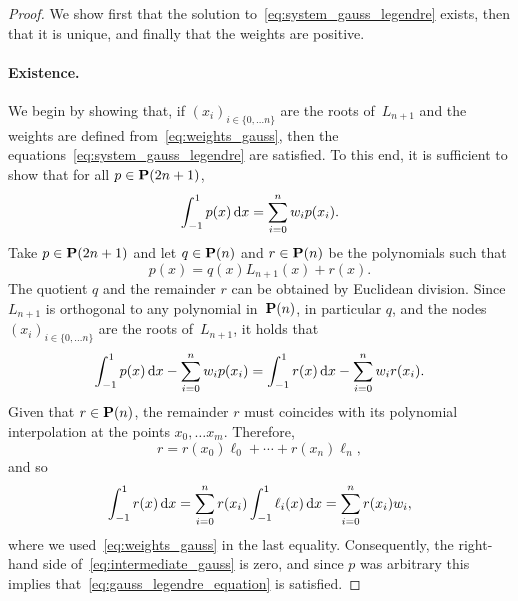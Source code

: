 \begin{proof}
    We show first that the solution to~\eqref{eq:system_gauss_legendre} exists,
    then that it is unique,
    and finally that the weights are positive.
    \paragraph{Existence.}
    We begin by showing that,
    if $(x_i)_{i \in \{0,\dotsc n\}}$ are the roots of~$L_{n+1}$ and the weights are defined from~\eqref{eq:weights_gauss},
    then the equations~\eqref{eq:system_gauss_legendre} are satisfied.
    To this end,
    it is sufficient to show that for all $p \in \mathbf P(2n + 1)$,
    \begin{equation}
        \label{eq:gauss_legendre_equation}
        \int_{-1}^{1} p(x) \, \mathrm d x = \sum_{i=0}^{n} w_i p(x_i).
    \end{equation}
    Take $p \in \mathbf P(2n + 1)$ and let $q \in \mathbf P(n)$ and $r \in \mathbf P(n)$ be the polynomials such that
    \[
        p(x) = q(x) L_{n+1}(x) + r(x).
    \]
    The quotient $q$ and the remainder $r$ can be obtained by Euclidean division.
    Since $L_{n+1}$ is orthogonal to any polynomial in~$\mathbf P(n)$,
    in particular $q$,
    and the nodes $(x_i)_{i \in \{0,\dotsc n\}}$ are the roots of~$L_{n+1}$,
    it holds that
    \begin{equation}
        \label{eq:intermediate_gauss}
        \int_{-1}^{1} p(x) \, \mathrm d x
        - \sum_{i=0}^{n} w_i p(x_i)
        = \int_{-1}^{1} r(x) \, \mathrm d x
        - \sum_{i=0}^{n} w_i r(x_i).
    \end{equation}
    Given that $r \in \mathbf P(n)$,
    the remainder $r$ must coincides with its polynomial interpolation at the points $x_0, \dotsc x_m$.
    Therefore,
    \[
        r = r(x_0) \ell_0 + \dotsb + r(x_n) \ell_n,
    \]
    and so
    \[
        \int_{-1}^1 r(x) \, \mathrm d x
        = \sum_{i=0}^{n} r(x_i) \int_{-1}^1 \ell_i(x) \, \mathrm d x
        = \sum_{i=0}^{n} r(x_i) w_i,
    \]
    where we used~\eqref{eq:weights_gauss} in the last equality.
    Consequently, the right-hand side of~\eqref{eq:intermediate_gauss} is zero,
    and since $p$ was arbitrary this implies that~\eqref{eq:gauss_legendre_equation} is satisfied.


\end{proof}
